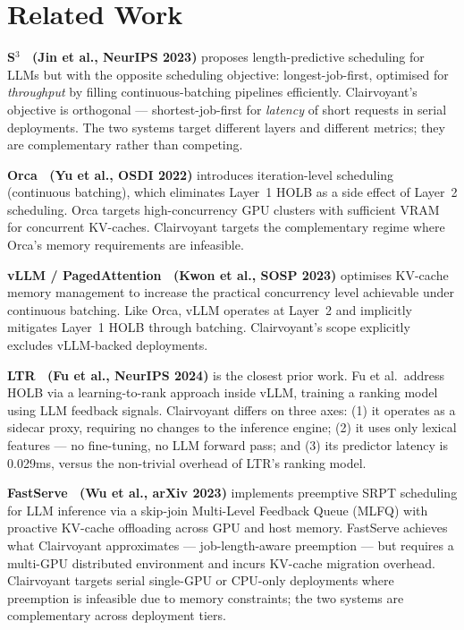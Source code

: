 \documentclass[10pt,letterpaper]{article}
\begin{document}
\section{Related Work}
\label{sec:related}

\textbf{S$^3$~\cite{jin2023s3} (Jin et al., NeurIPS 2023)} proposes length-predictive scheduling for LLMs but with the opposite scheduling objective: longest-job-first, optimised for \textit{throughput} by filling continuous-batching pipelines efficiently. Clairvoyant's objective is orthogonal --- shortest-job-first for \textit{latency} of short requests in serial deployments. The two systems target different layers and different metrics; they are complementary rather than competing.

\textbf{Orca~\cite{yu2022orca} (Yu et al., OSDI 2022)} introduces iteration-level scheduling (continuous batching), which eliminates Layer~1 HOLB as a side effect of Layer~2 scheduling. Orca targets high-concurrency GPU clusters with sufficient VRAM for concurrent KV-caches. Clairvoyant targets the complementary regime where Orca's memory requirements are infeasible.

\textbf{vLLM / PagedAttention~\cite{kwon2023vllm} (Kwon et al., SOSP 2023)} optimises KV-cache memory management to increase the practical concurrency level achievable under continuous batching. Like Orca, vLLM operates at Layer~2 and implicitly mitigates Layer~1 HOLB through batching. Clairvoyant's scope explicitly excludes vLLM-backed deployments.

\textbf{LTR~\cite{fu2024ltr} (Fu et al., NeurIPS 2024)} is the closest prior work. Fu et al.\ address HOLB via a learning-to-rank approach inside vLLM, training a ranking model using LLM feedback signals. Clairvoyant differs on three axes: (1) it operates as a sidecar proxy, requiring no changes to the inference engine; (2) it uses only lexical features --- no fine-tuning, no LLM forward pass; and (3) its predictor latency is 0.029ms, versus the non-trivial overhead of LTR's ranking model.

\textbf{FastServe~\cite{wu2023fastserve} (Wu et al., arXiv 2023)} implements preemptive SRPT scheduling for LLM inference via a skip-join Multi-Level Feedback Queue (MLFQ) with proactive KV-cache offloading across GPU and host memory. FastServe achieves what Clairvoyant approximates --- job-length-aware preemption --- but requires a multi-GPU distributed environment and incurs KV-cache migration overhead. Clairvoyant targets serial single-GPU or CPU-only deployments where preemption is infeasible due to memory constraints; the two systems are complementary across deployment tiers.
\end{document}
